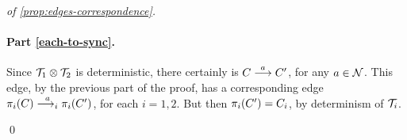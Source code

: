 \begin{proof}[of \cref{prop:edges-correspondence}]
\paragraph{Part \eqref{each-to-sync}.} 
Since $\mathcal{T}_1 \otimes \mathcal{T}_2$ is deterministic, there certainly is $C \overset{a}{\longrightarrow} C'$, for any $a \in \mathcal{N}$. This edge, by the previous part of the proof, has a corresponding edge $\pi_i(C) \overset{a}{\longrightarrow_{i}} \pi_i(C')$, for each $i=1,2$. But then $\pi_i(C') = C_i$, by determinism of $\mathcal{T}_i$.

\qed
\end{proof}
